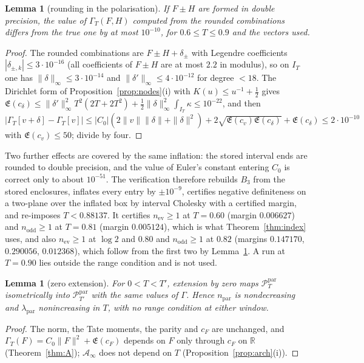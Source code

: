 \documentclass[11pt]{amsart}
\newtheorem{lemma}[theorem]{Lemma}
\theoremstyle{definition}
\theoremstyle{remark}
\newcommand{\R}{\mathbb R}
\newcommand{\PT}{\mathcal P_T}
\newcommand{\IT}{I_T}
\newcommand{\cF}{c_F}
\newcommand{\Lev}{\mathfrak E}
\newcommand{\Ainf}{\mathcal A_\infty}
\begin{document}
\begin{lemma}[rounding in the polarisation]\label{lem:polround}
If $F\pm H$ are formed in double precision, the value of $\Gamma_T(F,H)$ computed from
the rounded combinations differs from the true one by at most $10^{-10}$, for $0.6\le T\le0.9$ and the
vectors used.
\end{lemma}
\begin{proof}
The rounded combinations are $F\pm H+\delta_\pm$ with Legendre coefficients $|\delta_{\pm,k}|\le3\cdot10^{-16}$
(all coefficients of $F\pm H$ are at most $2.2$ in modulus), so on $\IT$ one has
$\|\delta\|_\infty\le3\cdot10^{-14}$ and $\|\delta'\|_\infty\le4\cdot10^{-12}$ for degree $<18$. The
Dirichlet form of Proposition~\ref{prop:nodes}(i) with $K(u)\le u^{-1}+\frac12$ gives
$\Lev(c_\delta)\le\|\delta'\|_\infty^2T^2(2T+2T^2)+\frac12\|\delta\|_\infty^2\int_{\IT}\kappa\le10^{-22}$,
and then
$|\Gamma_T[v+\delta]-\Gamma_T[v]|\le|C_0|(2\|v\|\|\delta\|+\|\delta\|^2)+2\sqrt{\Lev(c_v)\Lev(c_\delta)}+\Lev(c_\delta)\le2\cdot10^{-10}$
with $\Lev(c_v)\le50$; divide by four.
\end{proof}
Two further effects are covered by the same inflation: the stored interval ends are rounded to double
precision, and the value of Euler's constant entering $C_0$ is correct only to about $10^{-51}$. The
verification therefore rebuilds $B_3$ from the stored enclosures, inflates every entry by $\pm10^{-9}$, certifies negative definiteness on
a two-plane over the inflated box by interval Cholesky with a certified margin, and re-imposes
$T<0.88137$. It certifies $n_{\mathrm{ev}}\ge1$ at $T=0.60$ (margin $0.006627$) and $n_{\mathrm{odd}}\ge1$
at $T=0.81$ (margin $0.005124$), which is what Theorem~\ref{thm:index} uses, and also $n_{\mathrm{ev}}\ge1$
at $\log2$ and $0.80$ and $n_{\mathrm{odd}}\ge1$ at $0.82$ (margins $0.147170$, $0.290056$, $0.012368$),
which follow from the first two by Lemma~\ref{lem:zeroext}. A run at $T=0.90$ lies outside the range
condition and is not used.

\begin{lemma}[zero extension]\label{lem:zeroext}
For $0<T<T'$, extension by zero maps $\PT^{\mathrm{par}}$ isometrically into
$\mathcal P^{\mathrm{par}}_{T'}$ with the same values of $\Gamma$. Hence $n_{\mathrm{par}}$ is
nondecreasing and $\lambda_{\mathrm{par}}$ nonincreasing in $T$, with no range condition at either window.
\end{lemma}
\begin{proof}
The norm, the Tate moments, the parity and $\cF$ are unchanged, and $\Gamma_T(F)=C_0\|F\|^2+\Lev(\cF)$
depends on $F$ only through $\cF$ on $\R$ (Theorem~\ref{thm:A}); $\Ainf$ does not depend on $T$
(Proposition~\ref{prop:arch}(i)).
\end{proof}
\end{document}
